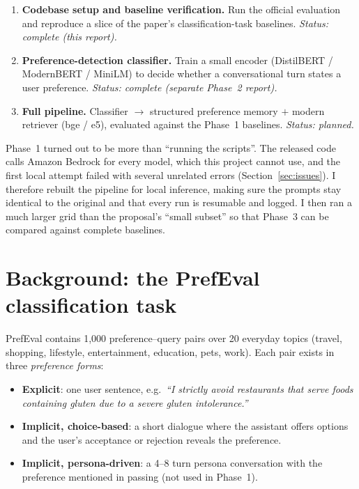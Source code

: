 \documentclass[11pt,a4paper]{article}
\begin{document}
\begin{enumerate}[label=\textbf{Phase \arabic*:},leftmargin=5.2em]
  \item \textbf{Codebase setup and baseline verification.} Run the official evaluation and reproduce a slice of the paper's
        classification-task baselines. \emph{Status: complete (this report).}
  \item \textbf{Preference-detection classifier.} Train a small encoder (DistilBERT / ModernBERT / MiniLM) to decide
        whether a conversational turn states a user preference. \emph{Status: complete (separate Phase~2 report).}
  \item \textbf{Full pipeline.} Classifier $\rightarrow$ structured preference memory $+$ modern retriever (bge / e5),
        evaluated against the Phase~1 baselines. \emph{Status: planned.}
\end{enumerate}

\noindent Phase~1 turned out to be more than ``running the scripts''. The released code calls Amazon Bedrock for every model,
which this project cannot use, and the first local attempt failed with several unrelated errors (Section~\ref{sec:issues}).
I therefore rebuilt the pipeline for local inference, making sure the prompts stay identical to the original and that every run is
resumable and logged. I then ran a much larger grid than the proposal's ``small subset'' so that Phase~3 can be compared
against complete baselines.

\section{Background: the PrefEval classification task}

PrefEval contains 1{,}000 preference--query pairs over 20 everyday topics (travel, shopping, lifestyle, entertainment,
education, pets, work). Each pair exists in three \emph{preference forms}:
\begin{itemize}
  \item \textbf{Explicit}: one user sentence, e.g.\ \emph{``I strictly avoid restaurants that serve foods containing gluten
        due to a severe gluten intolerance.''}
  \item \textbf{Implicit, choice-based}: a short dialogue where the assistant offers options and the user's
        acceptance or rejection reveals the preference.
  \item \textbf{Implicit, persona-driven}: a 4--8 turn persona conversation with the preference mentioned in passing
        (not used in Phase~1).
\end{itemize}
\end{document}
